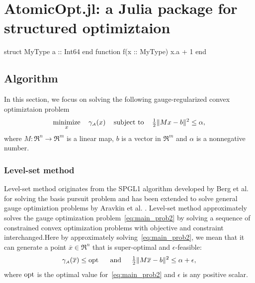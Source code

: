 \chapter{AtomicOpt.jl: a Julia package for structured optimiztaion}
\label{ch:App-AtomicOpt}

\begin{code}
  struct MyType
    a :: Int64
  end
  function f(x :: MyType)
    x.a + 1
  end
\end{code}



\section{Algorithm}

In this section, we focus on solving the following gauge-regularized convex optimiztaion problem 
\begin{equation}\label{eq:main_prob2}
	\displaystyle\mathop{\hbox{\rm minimize}}_{x}\enspace \enspace \gamma_{\scriptscriptstyle\mathcal{A}}(x) \enspace\enspace\mathop{\hbox{\rm subject to}}\enspace\enspace {\textstyle{\frac{1}{2}}}\|Mx - b\|^2 \leq \alpha,
\end{equation}
where $M:\Re^n\to\Re^m$ is a linear map, $b$ is a vector in $\Re^m$ and $\alpha$ is a nonnegative number.

\subsection{Level-set method}
Level-set method originates from the SPGL1 algorithm developed by Berg et al. \cite{berg2011sparse,berg2008probing} for solving the basis pursuit problem and has been extended to solve general gauge optimiztion problems by Aravkin et al. \cite{aravkin2016levelset}. Level-set method approximately solves the gauge optimization problem~\eqref{eq:main_prob2} by solving a sequence of constrained convex optimization problems with objective and constraint interchanged.Here by approximately solving~\eqref{eq:main_prob2}, we mean that it can generate a point $\overline{x}\in\Re^n$ that is super-optimal and $\epsilon$-feasible:
\begin{equation} \label{eq:super-optimal}
  \gamma_{\scriptscriptstyle\mathcal{A}}(\overline{x}) \leq \operatorname{opt} \enspace\hbox{\quad and\quad}\enspace {\textstyle{\frac{1}{2}}}\|M\overline{x} - b\|^2 \leq \alpha + \epsilon,
\end{equation}
where $\operatorname{opt}$ is the optimal value for~\eqref{eq:main_prob2} and $\epsilon$ is any positive scalar.

